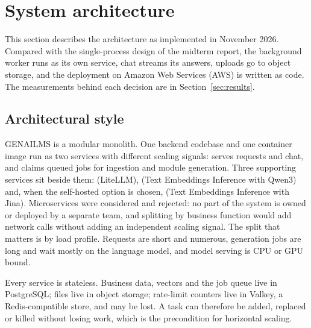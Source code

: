 \clearpage\section{System architecture}\label{sec:architecture}
This section describes the architecture as implemented in November 2026. Compared with the single-process design of the midterm report, the background worker runs as its own service, chat streams its answers, uploads go to object storage, and the deployment on Amazon Web Services (AWS) is written as code. The measurements behind each decision are in Section~\ref{sec:results}.
\subsection{Architectural style}
GENAILMS is a modular monolith. One backend codebase and one container image run as two services with different scaling signals:  serves requests and chat, and  claims queued jobs for ingestion and module generation. Three supporting services sit beside them:  (LiteLLM),  (Text Embeddings Inference with Qwen3) and, when the self-hosted option is chosen,  (Text Embeddings Inference with Jina). Microservices were considered and rejected: no part of the system is owned or deployed by a separate team, and splitting by business function would add network calls without adding an independent scaling signal. The split that matters is by load profile. Requests are short and numerous, generation jobs are long and wait mostly on the language model, and model serving is CPU or GPU bound.

Every service is stateless. Business data, vectors and the job queue live in PostgreSQL; files live in object storage; rate-limit counters live in Valkey, a Redis-compatible store, and may be lost. A task can therefore be added, replaced or killed without losing work, which is the precondition for horizontal scaling.
